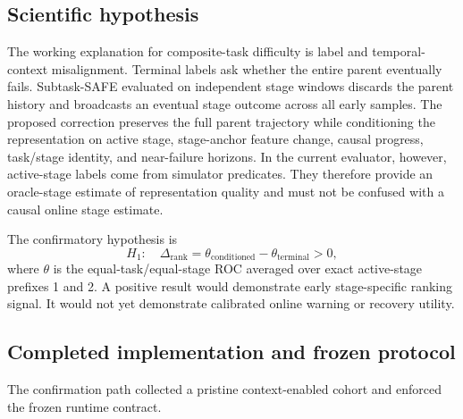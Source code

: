 
\subsection{Scientific hypothesis}

The working explanation for composite-task difficulty is label and temporal-context misalignment. Terminal labels ask whether the entire parent eventually fails. Subtask-SAFE evaluated on independent stage windows discards the parent history and broadcasts an eventual stage outcome across all early samples. The proposed correction preserves the full parent trajectory while conditioning the representation on active stage, stage-anchor feature change, causal progress, task/stage identity, and near-failure horizons. In the current evaluator, however, active-stage labels come from simulator predicates. They therefore provide an oracle-stage estimate of representation quality and must not be confused with a causal online stage estimate.

The confirmatory hypothesis is
\begin{equation}
  H_1:\quad
  \Delta_{\mathrm{rank}}
  = \theta_{\mathrm{conditioned}}
  -\theta_{\mathrm{terminal}}>0,
\end{equation}
where $\theta$ is the equal-task/equal-stage ROC averaged over exact active-stage prefixes 1 and 2. A positive result would demonstrate early stage-specific ranking signal. It would not yet demonstrate calibrated online warning or recovery utility.

\subsection{Completed implementation and frozen protocol}

The confirmation path collected a pristine context-enabled cohort and enforced the frozen runtime contract.

